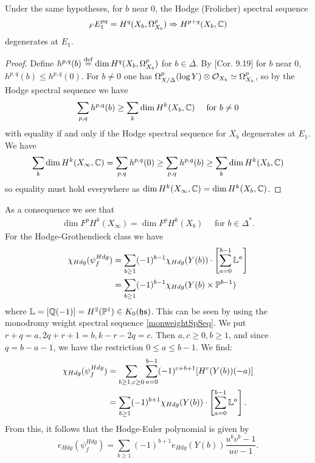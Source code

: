\documentclass[../main.tex]{subfiles}
\begin{document}
\begin{cor}
    Under the same hypotheses, for $b$ near $0$, the Hodge (Frolicher) spectral sequence 
    \[
    _F E_1^{pq} = H^q(X_b,\Omega^p_{X_b}) \Rightarrow H^{p+q} (X_b, \mathbb{C})
    \]
    degenerates at $E_1$.
\end{cor}
\begin{proof}
    Define $h^{p,q}(b) \stackrel{\text{def}}{=} \dim H^q(X_b,\Omega^p_{X_b}) $ for $b \in \Delta$. By \cite{Voi07}[Cor. 9.19] for $b$ near $0$, $h^{p,q}(b) \leq h^{p,q}(0) $. For $b \neq 0$ one has $\Omega^p_{X/\Delta} (\log Y ) \otimes \mathcal{O}_{X_b} \simeq \Omega^p_{X_b} $, so by the Hodge spectral sequence we have
    \[
    \sum_{p,q} h^{p,q}(b) \geq \sum_k \dim H^k(X_b,\mathbb{C}) \quad \text{ for } b \neq 0
    \]
    with equality if and only if the Hodge spectral sequence for $X_b$ degenerates at $E_1$. We have
    \[
    \sum_k \dim H^k(X_{\infty},\mathbb{C}) =  \sum_{p,q} h^{p,q}(0) \geq \sum_{p,q} h^{p,q}(b) \geq \sum_k \dim H^k(X_{b},\mathbb{C})
    \]
    so equality must hold everywhere as $\dim H^k(X_{\infty},\mathbb{C}) = \dim H^k(X_{b},\mathbb{C})$.
\end{proof}
As a consequence we see that 
\begin{align} \label{equalityHdgfiltr}
    \dim F^pH^k(X_{\infty}) =  \dim F^pH^k(X_{b}) \quad \text{ for } b \in \Delta^*.
\end{align}
For the Hodge-Grothendieck class we have
    \begin{align} \label{Hdg-Groth_class}
        \chi_{Hdg}(\psi_f^{Hdg}) &= \sum_{b \geq 1} (-1)^{b-1} \chi_{Hdg}(Y(b)) \cdot \left[ \sum_{a=0}^{b-1} \mathbb{L}^a \right] \\
        &= \sum_{b \geq 1} (-1)^{b-1} \chi_{Hdg}( Y(b) \times \mathbb{P}^{b-1})
    \end{align}
where $\mathbb{L} = [\mathbb{Q}(-1)] = H^2(\mathbb{P}^1) \in K_0(\mathfrak{hs})$.
This can be seen by using the monodromy weight spectral sequence \eqref{monweightSpSeq}. 
We put $r+q=a, 2q+r+1=b, k-r-2q=c$. Then $a,c \geq 0, b \geq 1$, and since $q=b-a-1$, we have the restriction $0 \leq a \leq b-1$. We find:
    \begin{align*}
        \chi_{Hdg}(\psi_f^{Hdg}) &= \sum_{b \geq 1, c \geq 0} \sum_{a =0}^{b-1} (-1)^{c+b+1} [ H^c(Y(b))(-a)] \\
        &= \sum_{b \geq 1} (-1)^{b+1} \chi_{Hdg}(Y(b)) \cdot \left[ \sum_{a=0}^{b-1} \mathbb{L}^a  \right].        
    \end{align*}
    From this, it follows that the Hodge-Euler polynomial is given by 
    \[
    e_{Hdg}(\psi_f^{Hdg})=\sum_{b \geq 1} (-1)^{b+1} e_{Hdg}(Y(b)) \frac{u^bv^b-1}{uv-1}.
    \]
\end{document}
